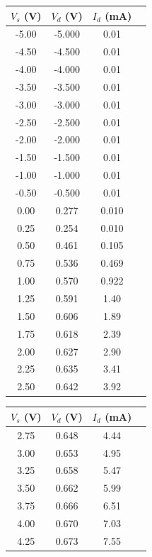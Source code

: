 \documentclass{article}
\begin{document}
\begin{table}[hbtp]
  \centering
  \begin{subtable}[t]{0.5\textwidth}
    \begin{tabular}{cccc}
      $V_s$ (V) & $V_d$ (V) & $I_d$ (mA) \\
      \hline
      -5.00 & -5.000 & 0.01 \\
      -4.50 & -4.500 & 0.01 \\
      -4.00 & -4.000 & 0.01 \\
      -3.50 & -3.500 & 0.01 \\
      -3.00 & -3.000 & 0.01 \\
      -2.50 & -2.500 & 0.01 \\
      -2.00 & -2.000 & 0.01 \\
      -1.50 & -1.500 & 0.01 \\
      -1.00 & -1.000 & 0.01 \\
      -0.50 & -0.500 & 0.01 \\
      0.00 & 0.277 & 0.010 \\
      0.25 & 0.254 & 0.010 \\
      0.50 & 0.461 & 0.105 \\
      0.75 & 0.536 & 0.469 \\
      1.00 & 0.570 & 0.922 \\
      1.25 & 0.591 & 1.40 \\
      1.50 & 0.606 & 1.89 \\
      1.75 & 0.618 & 2.39 \\
      2.00 & 0.627 & 2.90 \\
      2.25 & 0.635 & 3.41 \\
      2.50 & 0.642 & 3.92 \\
    \end{tabular}
  \end{subtable}%
  \begin{subtable}[t]{0.5\textwidth}
    \begin{tabular}{cccc}
      $V_s$ (V) & $V_d$ (V) & $I_d$ (mA) \\
      \hline
      2.75 & 0.648 & 4.44 \\
      3.00 & 0.653 & 4.95 \\
      3.25 & 0.658 & 5.47 \\
      3.50 & 0.662 & 5.99 \\
      3.75 & 0.666 & 6.51 \\
      4.00 & 0.670 & 7.03 \\
      4.25 & 0.673 & 7.55 \\

\end{tabular}
\end{subtable}
\end{table}
\end{document}
